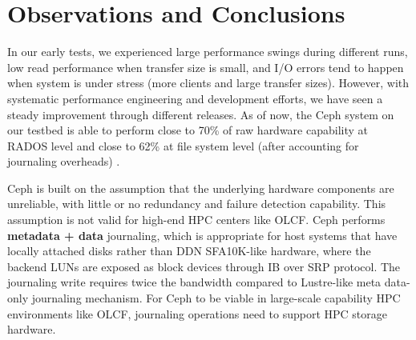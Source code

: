 \section{Observations and Conclusions}
\label{sec:conclusion}

In our early tests, we experienced large performance swings during different
runs, low read performance when transfer size is small, and I/O errors tend to
happen when system is under stress (more clients and large transfer sizes).
However, with systematic performance engineering and development efforts, we
have seen a steady improvement through different releases. As of now, the Ceph
system on our testbed is able to perform close to 70\% of raw hardware
capability at RADOS level and close to 62\% at file system level (after
accounting for journaling overheads) . 

Ceph is built on the assumption that the underlying hardware components are
unreliable, with little or no redundancy and failure detection capability.
This assumption is not valid for high-end HPC centers like OLCF.
Ceph performs \textbf{metadata + data} journaling, which is appropriate for host
systems that have locally attached disks rather than DDN SFA10K-like hardware,
where the backend LUNs are exposed as block devices through IB over SRP
protocol. The journaling write requires twice the bandwidth compared to
Lustre-like meta data-only journaling mechanism. For Ceph to be viable in
large-scale capability HPC environments like OLCF, journaling operations need
to support HPC storage hardware.



